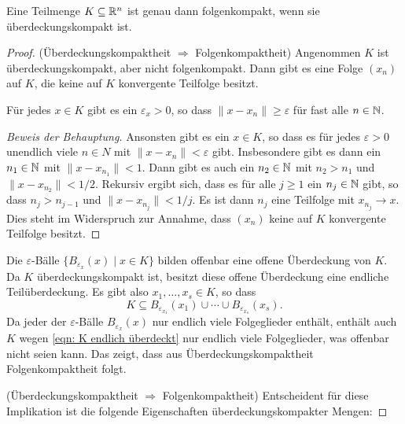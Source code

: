\documentclass[a4paper,10pt]{article}
\begin{document}
\begin{prop}
 Eine Teilmenge $K \subseteq \mathbb{R}^n$ ist genau dann folgenkompakt, wenn sie überdeckungskompakt ist.
\end{prop}
\begin{proof}
 (Überdeckungskompaktheit $\Rightarrow$ Folgenkompaktheit) Angenommen $K$ ist überdeckungskompakt, aber nicht folgenkompakt. Dann gibt es eine Folge $(x_n)$ auf $K$, die keine auf $K$ konvergente Teilfolge besitzt.
 
 \begin{beh}
  Für jedes $x \in K$ gibt es ein $\varepsilon_x > 0$, so dass $\|x - x_n\| \geq \varepsilon$ für fast alle $n \in \mathbb{N}$.
 \end{beh}
 \begin{proof}[Beweis der Behauptung]
  Ansonsten gibt es ein $x \in K$, so dass es für jedes $\varepsilon > 0$ unendlich viele $n \in N$ mit $\|x - x_n\| < \varepsilon$ gibt. Insbesondere gibt es dann ein $n_1 \in \mathbb{N}$ mit $\|x - x_{n_1}\| < 1$. Dann gibt es auch ein $n_2 \in \mathbb{N}$ mit $n_2 > n_1$ und $\|x - x_{n_2}\| < 1/2$. Rekursiv ergibt sich, dass es für alle $j \geq 1$ ein $n_j \in \mathbb{N}$ gibt, so dass $n_j > n_{j-1}$ und $\|x - x_{n_j}\| < 1/j$. Es ist dann $n_j$ eine Teilfolge mit $x_{n_j} \to x$. Dies steht im Widerspruch zur Annahme, dass $(x_n)$ keine auf $K$ konvergente Teilfolge besitzt.
 \end{proof}
 
 Die $\varepsilon$-Bälle $\{B_{\varepsilon_x}(x) \mid x \in K\}$ bilden offenbar eine offene Überdeckung von $K$. Da $K$ überdeckungskompakt ist, besitzt diese offene Überdeckung eine endliche Teilüberdeckung. Es gibt also $x_1, \dotsc, x_s \in K$, so dass
 \begin{equation}\label{eqn: K endlich überdeckt}
  K \subseteq B_{\varepsilon_{x_1}}(x_1) \cup \dotsb \cup B_{\varepsilon_{x_s}}(x_s).
 \end{equation}
 Da jeder der $\varepsilon$-Bälle $B_{\varepsilon_x}(x)$ nur endlich viele Folgeglieder enthält, enthält auch $K$ wegen \eqref{eqn: K endlich überdeckt} nur endlich viele Folgeglieder, was offenbar nicht seien kann. Das zeigt, dass aus Überdeckungskompaktheit Folgenkompaktheit folgt.
 
 (Überdeckungskompaktheit $\Rightarrow$ Folgenkompaktheit) Entscheident für diese Implikation ist die folgende Eigenschaften überdeckungskompakter Mengen:
 

\end{proof}
\end{document}
